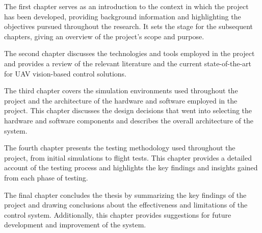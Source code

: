 The first chapter serves as an introduction to the context in which the project has been developed, providing background information and highlighting the objectives pursued throughout the research. It sets the stage for the subsequent chapters, giving an overview of the project's scope and purpose.

The second chapter discusses the technologies and tools employed in the project and provides a review of the relevant literature and the current state-of-the-art for UAV vision-based control solutions.

The third chapter covers the simulation environments used throughout the project and the architecture of the hardware and software employed in the project. This chapter discusses the design decisions that went into selecting the hardware and software components and describes the overall architecture of the system.

The fourth chapter presents the testing methodology used throughout the project, from initial simulations to flight tests. This chapter provides a detailed account of the testing process and highlights the key findings and insights gained from each phase of testing.

The final chapter concludes the thesis by summarizing the key findings of the project and drawing conclusions about the effectiveness and limitations of the control system. Additionally, this chapter provides suggestions for future development and improvement of the system.
